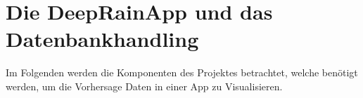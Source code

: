 \section{Die DeepRainApp und das Datenbankhandling}\label{die deeprain app und das datenbankhandling}  
Im Folgenden werden die Komponenten des Projektes betrachtet, welche benötigt werden, um die Vorhersage Daten in einer 
App zu Visualisieren.





